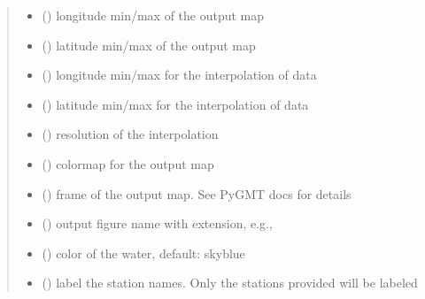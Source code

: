 \documentclass[letterpaper,10pt,english]{sphinxmanual}
\begin{document}
\begin{fulllineitems}
\begin{quote}
\begin{description}
\begin{itemize}
\item {} 
\sphinxAtStartPar
{} () \textendash{} longitude min/max of the output map

\item {} 
\sphinxAtStartPar
{} () \textendash{} latitude min/max of the output map

\item {} 
\sphinxAtStartPar
{} () \textendash{} longitude min/max for the interpolation of data

\item {} 
\sphinxAtStartPar
{} () \textendash{} latitude min/max for the interpolation of data

\item {} 
\sphinxAtStartPar
{} () \textendash{} resolution of the interpolation

\item {} 
\sphinxAtStartPar
{} () \textendash{} colormap for the output map

\item {} 
\sphinxAtStartPar
{} () \textendash{} frame of the output map. See PyGMT docs for details

\item {} 
\sphinxAtStartPar
{} () \textendash{} output figure name with extension, e.g., 

\item {} 
\sphinxAtStartPar
{} () \textendash{} color of the water, default: skyblue

\item {} 
\sphinxAtStartPar
{} () \textendash{} label the station names. Only the stations provided will be labeled


\end{itemize}
\end{description}
\end{quote}
\end{fulllineitems}
\end{document}

